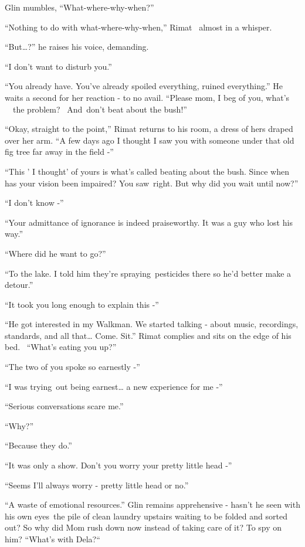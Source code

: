 \documentclass[twoside,11pt]{book}
\begin{document}
Glin mumbles, ``What-where-why-when?''

``Nothing to do with what-where-why-when,'' Rimat \ almost in a whisper.

``But{\dots}?'' he raises his voice, demanding.

``I don't want to disturb you.''

``You already have. You've already spoiled everything, ruined everything.'' He waits a second
for her reaction - to no avail. ``Please mom, I beg of you, what's \ \ the problem? \ And~don't beat about
the bush!''

``Okay, straight to the point,'' Rimat returns to his room, a dress of hers draped over her
arm. ``A few days ago I thought I saw you with someone under that old fig tree far away in the field
-''

``This ' I thought' of yours is what's called beating about the bush. Since when has your vision been
impaired? You saw~right. But why did you wait until now?''

``I don't know -''

``Your admittance of ignorance is indeed praiseworthy. It was a guy who lost his way.''

``Where did he want to go?''

``To the lake. I told him they're spraying~pesticides there so he'd better make a detour.''

``It took you long enough to explain this -''

``He got interested in my Walkman. We started talking - about music, recordings, standards, and all
that{\dots} Come. Sit.'' Rimat complies and sits on the edge of his bed.~ ``What's eating you
up?''

``The two of you spoke so earnestly -''

``I was trying~out being earnest{\dots} a new experience for me -''

``Serious conversations scare me.''

``Why?''

``Because they do.''

``It was only a show. Don't you worry your pretty little head -''

``Seems I'll always worry - pretty little head or no.''

``A waste of emotional resources.'' Glin remains apprehensive - hasn't he seen with his own
eyes~the pile of clean laundry upstairs waiting to be folded and sorted out? So why did Mom rush down now instead of
taking care of it? To spy on him? ``What's with Dela?``~
\end{document}
